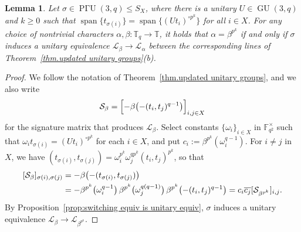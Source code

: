 \documentclass[11pt]{article}
\newtheorem{lemma}[theo]{Lemma}
\theoremstyle{definition}
\numberwithin{equation}{section}
\begin{document}
\begin{lemma}
\label{lem: unitary equiv}
Let $\sigma \in \operatorname{P\text{$\Gamma$}U}(3,q) \leq S_X$, where there is a unitary $U \in \operatorname{GU}(3,q)$ and $k \geq 0$ such that $\operatorname{span}\{t_{\sigma(i)} \} = \operatorname{span}\{(Ut_i)^{\circ p^k}\}$ for all $i \in X$.
For any choice of nontrivial characters $\alpha,\beta \colon \mathbb{T}_q \to \mathbb{T}$, it holds that $\alpha = \beta^{p^k}$ if and only if $\sigma$ induces a unitary equivalence $\mathscr{L}_\beta \to \mathscr{L}_\alpha$ between the corresponding lines of Theorem~\ref{thm.updated unitary groups}(b).
\end{lemma}

\begin{proof}
We follow the notation of Theorem~\ref{thm.updated unitary groups}, and we also write 
\[
\mathcal{S}_\beta = \Bigl[ - \beta\bigl(-(t_i,t_j)^{q-1} \bigr) \Bigr]_{i,j \in X}
\] 
for the signature matrix that produces $\mathscr{L}_\beta$.
Select constants $\{ \omega_i \}_{i\in X}$ in $\mathbb{F}_{q^2}^\times$ such that $\omega_i t_{\sigma(i)} = (U t_i)^{\circ p^k}$ for each $i \in X$, and put $c_i := \beta^{p^k}(\omega_i^{q-1})$.
For $i\neq j$ in $X$, we have $(t_{\sigma(i)}, t_{\sigma(j)}) = \omega_i^{p^k} \omega_j^{q p^k} (t_i, t_j)^{p^k}$, so that
\begin{align}
\label{eq: unitary equiv 1}
[\mathcal{S}_\beta]_{\sigma(i), \sigma(j)}
&= -\beta \bigl( - (t_{\sigma(i)}, t_{\sigma(j)} ) \bigr) \\ \notag
&= - \beta^{p^k}\bigl( \omega_i^{q-1} \bigr) \, \beta^{p^k}\bigl( \omega_j^{q(q-1)} \bigr) \, \beta^{p^k}\bigl( -(t_i,t_j)^{q-1} \bigr)
= c_i \overline{c_j} [ \mathcal{S}_{\beta^{p^k}} ]_{i,j}.
\end{align}
By Proposition~\ref{prop:switching equiv is unitary equiv}, $\sigma$ induces a unitary equivalence $\mathscr{L}_\beta \to \mathscr{L}_{\beta^{p^k}}$.


\end{proof}
\end{document}
